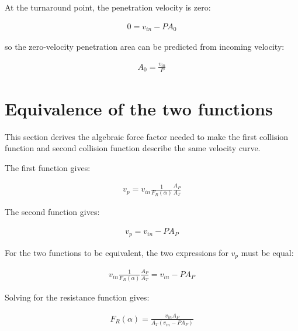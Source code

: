 At the turnaround point, the penetration velocity is zero:

\begin{equation}
\begin{aligned}
0 = v_{in}-P A_0
\end{aligned}
\end{equation}

so the zero-velocity penetration area can be predicted from incoming velocity:

\begin{equation}
\begin{aligned}
A_0 = \frac{v_{in}}{P}
\end{aligned}
\end{equation}

\section{Equivalence of the two functions}

This section derives the algebraic force factor needed to make the first
collision function and second collision function describe the same velocity
curve.

The first function gives:

\begin{equation}
\begin{aligned}
v_p = v_{in}\frac{1}{F_R(\alpha)}\frac{A_P}{A_T}
\end{aligned}
\end{equation}

The second function gives:

\begin{equation}
\begin{aligned}
v_p = v_{in}-P A_P
\end{aligned}
\end{equation}

For the two functions to be equivalent, the two expressions for $v_p$ must be equal:

\begin{equation}
\begin{aligned}
v_{in}\frac{1}{F_R(\alpha)}\frac{A_P}{A_T}
=
v_{in}-P A_P
\end{aligned}
\end{equation}

Solving for the resistance function gives:

\begin{equation}
\begin{aligned}
F_R(\alpha)
=
\frac{v_{in}A_P}
{A_T(v_{in}-P A_P)}
\end{aligned}
\end{equation}

